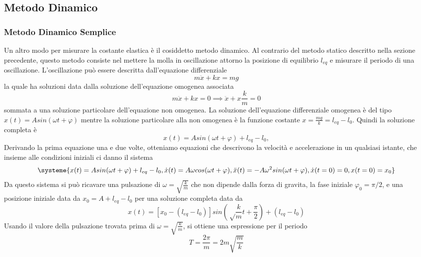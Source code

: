 \documentclass[a4paper]{article}
\begin{document}
\subsection{Metodo Dinamico}
\subsubsection{Metodo Dinamico Semplice}
Un altro modo per misurare la costante elastica è il cosiddetto metodo dinamico. Al contrario del metodo statico descritto nella sezione precedente, questo metodo consiste nel mettere la molla in oscillazione attorno la posizione di equilibrio $l_{eq}$ e misurare il periodo di una oscillazione. L'oscillazione può essere descritta dall'equazione differenziale 
\begin{equation}
    m\ddot{x} + kx = mg
\end{equation}
la quale ha soluzioni data dalla soluzione dell'equazione omogenea associata 
\begin{equation}
    m\ddot{x}+kx=0  \implies \ddot{x} + x \frac{k}{m}=0 
\end{equation}
sommata a una soluzione particolare dell'equazione non omogenea. La soluzione dell'equazione differenziale omogenea è del tipo $x(t)=Asin(\omega t + \varphi)$ mentre la soluzione particolare alla non omogenea è la funzione costante $x=\frac{mg}{k}=l_{eq}-l_0$. Quindi la soluzione completa è
\begin{equation}
    x(t)=Asin(\omega t + \varphi) + l_{eq}-l_0,
\end{equation}
Derivando la prima equazione una e due volte, otteniamo equazioni che descrivono la velocità e accelerazione in un qualsiasi istante, che insieme alle condizioni iniziali ci danno il sistema
\begin{equation*}
\systeme{
    x(t)=Asin(\omega t + \varphi) + l_{eq}-l_0,
    \dot{x}(t) = A\omega cos(\omega t + \varphi),
    \ddot{x}(t) = -A\omega^2 sin(\omega t + \varphi),
    \dot{x}(t=0)=0,
    x(t=0)=x_0
    }
\end{equation*}
Da questo sistema si può ricavare una pulsazione di $\omega = \sqrt{\frac{k}{m}}$ che non dipende dalla forza di gravita, la fase iniziale $\varphi_0=\pi/2$, e una posizione iniziale data da $x_0 = A + l_{eq} - l_0$ per una soluzione completa data da
\begin{equation}
    x(t)=[x_0-(l_{eq}-l_0)]sin(\sqrt\frac{k}{m} t + \frac{\pi}{2}) + (l_{eq} - l_0)    
\end{equation}
Usando il valore della pulsazione trovata prima di $\omega = \sqrt{\frac{k}{m}}$, si ottiene una espressione per il periodo 
\begin{equation}
    T = \frac{2\pi}{m}=2m\sqrt{\frac{m}{k}}
\end{equation}
\end{document}
